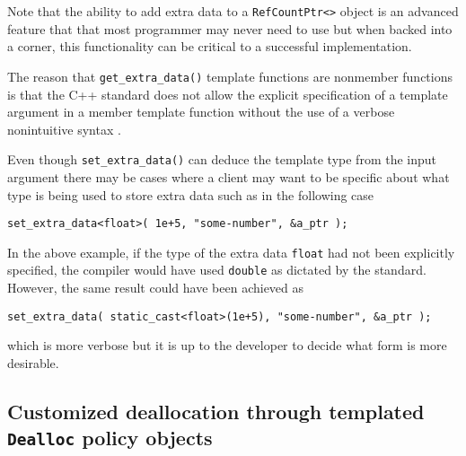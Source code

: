 Note that the ability to add extra data to a {}\texttt{RefCountPtr<>}
object is an advanced feature that that most programmer may never need
to use but when backed into a corner, this functionality can be
critical to a successful implementation.

The reason that {}\texttt{get\-\_extra\-\_data()} template functions
are nonmember functions is that the C++ standard does not allow the
explicit specification of a template argument in a member template
function without the use of a verbose nonintuitive syntax
{}\cite[C.13.6]{ref:stroustrup_2000}.

Even though {}\texttt{set\-\_extra\-\_data()} can deduce the template
type from the input argument there may be cases where a client may
want to be specific about what type is being used to store extra data
such as in the following case

{\scriptsize\begin{verbatim}
set_extra_data<float>( 1e+5, "some-number", &a_ptr );
\end{verbatim}}

{}\noindent{}In the above example, if the type of the extra data
{}\texttt{float} had not been explicitly specified, the compiler
would have used {}\texttt{double} as dictated by the standard.
However, the same result could have been achieved as

{\scriptsize\begin{verbatim}
set_extra_data( static_cast<float>(1e+5), "some-number", &a_ptr );
\end{verbatim}}

{}\noindent{}which is more verbose but it is up to the developer to
decide what form is more desirable.

%
\subsection{Customized deallocation through templated {}\texttt{Dealloc} policy objects}
\label{rcp:sec:dealloc}
%

